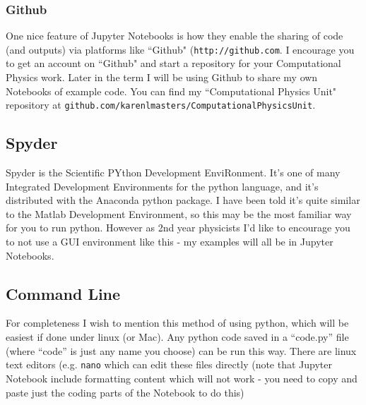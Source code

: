 \documentclass[%
 reprint,
 amsmath,amssymb,
 aps,
]{revtex4-1}
\begin{document}
\subsubsection{Github}
 One nice feature of Jupyter Notebooks is how they enable the sharing of code (and outputs) via platforms like ``Github" ({\tt http://github.com}. I encourage you to get an account on ``Github" and start a repository for your Computational Physics work. Later in the term I will be using Github to share my own Notebooks of example code. You can find my ``Computational Physics Unit" repository at {\tt github.com/karenlmasters/ComputationalPhysicsUnit}. 

\subsection{Spyder} 

Spyder is the Scientific PYthon Development EnviRonment. It's one of many Integrated Development Environments for the python language, and it's distributed with the Anaconda python package. I have been told it's quite similar to the Matlab Development Environment, so this may be the most familiar way for you to run python. However as 2nd year physicists I'd like to encourage you to not use a GUI environment like this - my examples will all be in Jupyter Notebooks. 



\subsection{Command Line}

For completeness I wish to mention this method of using python, which will be easiest if done under linux (or Mac). Any python code saved in a ``code.py'' file (where ``code'' is just any name you choose) can be run this way. There are linux text editors (e.g. {\tt nano} which can edit these files directly (note that Jupyter Notebook include formatting content which will not work - you need to copy and paste just the coding parts of the Notebook to do this)
\end{document}
